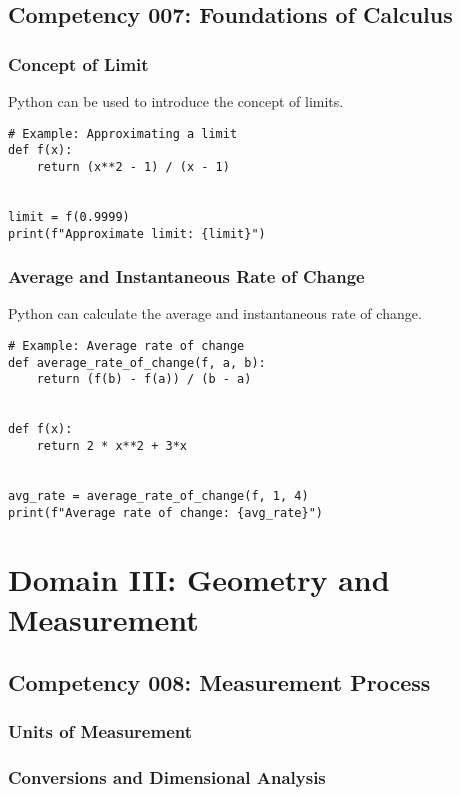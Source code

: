 \documentclass{book}
\begin{document}
\section{Competency 007: Foundations of Calculus}
\subsection{Concept of Limit}
Python can be used to introduce the concept of limits.


\begin{lstlisting}[style=pythonstyle]
# Example: Approximating a limit
def f(x):
    return (x**2 - 1) / (x - 1)


limit = f(0.9999)
print(f"Approximate limit: {limit}")
\end{lstlisting}


\subsection{Average and Instantaneous Rate of Change}
Python can calculate the average and instantaneous rate of change.


\begin{lstlisting}[style=pythonstyle]
# Example: Average rate of change
def average_rate_of_change(f, a, b):
    return (f(b) - f(a)) / (b - a)


def f(x):
    return 2 * x**2 + 3*x


avg_rate = average_rate_of_change(f, 1, 4)
print(f"Average rate of change: {avg_rate}")
\end{lstlisting}


\chapter{Domain III: Geometry and Measurement}

\section{Competency 008: Measurement Process}
\subsection{Units of Measurement}
\subsection{Conversions and Dimensional Analysis}
\end{document}
